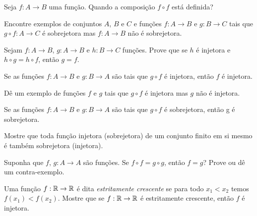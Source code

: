\documentclass[12pt]{exam}
\begin{document}
\vspace{.3cm}

\questao{} Seja $f : A \to B$ uma função. Quando a composição $f \circ f$ está definida?

\vspace{.3cm}

\questao{} Encontre exemplos de conjuntos $A$, $B$ e $C$ e funções $f : A \to B$ e $g : B \to C$ tais que $g \circ f : A \to C$ é sobrejetora mas $f : A \to B$ não é sobrejetora.

\vspace{.3cm}

\questao{} Sejam $f : A \to B$, $g : A \to B$ e $h : B \to C$ funções. Prove que se $h$ é injetora e $h \circ g = h \circ f$, então $g = f$.

\vspace{.3cm}

\questao{} Se as funções $f : A \to B$ e $g : B\to A$ são
tais que $g\circ f$ é injetora, então $f$ é injetora.

\vspace{.3cm}

\questao{} Dê um exemplo de funções $f$ e $g$ tais que $g \circ f$ é injetora mas $g$ não é injetora.

\vspace{.3cm}

\questao{} Se as funções $f : A \to B$ e $g : B\to A$ são
tais que $g\circ f$ é sobrejetora, então g é sobrejetora.

\vspace{.3cm}

\questao{} Mostre que toda função injetora (sobrejetora) de um conjunto finito em si mesmo é também sobrejetora (injetora).

\vspace{.3cm}

\questao{} Suponha que $f$, $g : A \to A$ são funções. Se $f \circ f = g \circ g$, então $f = g$? Prove ou dê um contra-exemplo.

\vspace{.3cm}

\questao{} Uma função $f : \mathbb{R} \to \mathbb{R}$ é dita \textit{estritamente crescente} se para todo $x_1 < x_2$ temos $f(x_1) < f(x_2)$. Mostre que se $f : \mathbb{R} \to \mathbb{R}$ é estritamente crescente, então $f$ é injetora.

\vspace{.3cm}
\end{document}
